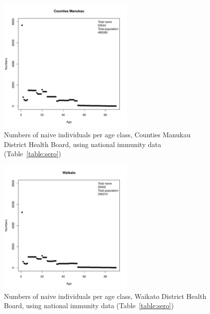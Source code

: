 \documentclass{article}
\begin{document}
\begin{figure}[H]
     \begin{center}
     \includegraphics[width=0.6\textwidth]{dhb4.pdf}
     \end{center}
     \caption{Numbers of naive individuals per age class, Counties Manukau District Health Board, using national immunity data (Table~\ref{table:sero})}
     \label{fig:Counties_Manukau}
\end{figure}

\begin{figure}[H]
     \begin{center}
     \includegraphics[width=0.6\textwidth]{dhb5.pdf}
     \end{center}
     \caption{Numbers of naive individuals per age class, Waikato District Health Board, using national immunity data (Table~\ref{table:sero})}
     \label{fig:Waikato}
\end{figure}
\end{document}
